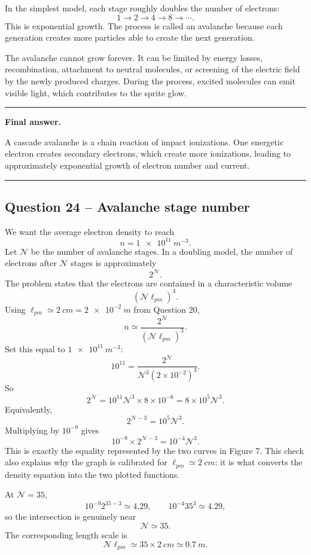 \documentclass[11pt,a4paper]{article}
\newenvironment{finalanswer}{%
  \begin{center}\begin{minipage}{0.94\linewidth}\hrule\vspace{0.45em}\textbf{Final answer. }%
}{%
  \vspace{0.45em}\hrule\end{minipage}\end{center}%
}
\begin{document}
In the simplest model, each stage roughly doubles the number of electrons:
\[
 1\to2\to4\to8\to\cdots.
\]
This is exponential growth. The process is called an avalanche because each generation creates more particles able to create the next generation.

The avalanche cannot grow forever. It can be limited by energy losses, recombination, attachment to neutral molecules, or screening of the electric field by the newly produced charges. During the process, excited molecules can emit visible light, which contributes to the sprite glow.

\begin{finalanswer}
A cascade avalanche is a chain reaction of impact ionizations. One energetic electron creates secondary electrons, which create more ionizations, leading to approximately exponential growth of electron number and current.
\end{finalanswer}

\subsection*{Question 24 -- Avalanche stage number}

We want the average electron density to reach
\[
 n=\SI{1e11}{m^{-3}}.
\]
Let $\mathcal{N}$ be the number of avalanche stages. In a doubling model, the number of electrons after $\mathcal{N}$ stages is approximately
\[
 2^{\mathcal{N}}.
\]
The problem states that the electrons are contained in a characteristic volume
\[
 (\mathcal{N}\ell_{pm})^3.
\]
Using $\ell_{pm}\simeq\SI{2}{cm}=\SI{2e-2}{m}$ from Question 20,
\[
 n\simeq\frac{2^{\mathcal{N}}}{(\mathcal{N}\ell_{pm})^3}.
\]
Set this equal to $\SI{1e11}{m^{-3}}$:
\[
 10^{11}=\frac{2^{\mathcal{N}}}{\mathcal{N}^3(2\times10^{-2})^3}.
\]
So
\[
 2^{\mathcal{N}}=10^{11}\mathcal{N}^3\times8\times10^{-6}
 =8\times10^5\mathcal{N}^3.
\]
Equivalently,
\[
 2^{\mathcal{N}-3}=10^5\mathcal{N}^3.
\]
Multiplying by $10^{-9}$ gives
\[
 10^{-9}\times 2^{\mathcal{N}-3}=10^{-4}\mathcal{N}^3.
\]
This is exactly the equality represented by the two curves in Figure 7. This check also explains why the graph is calibrated for \(\ell_{pm}\simeq\SI{2}{cm}\): it is what converts the density equation into the two plotted functions.

At \(\mathcal{N}=35\),
\[
10^{-9}2^{35-3}\simeq4.29,
\qquad
10^{-4}35^3\simeq4.29,
\]
so the intersection is genuinely near
\[
 \mathcal{N}\simeq35.
\]
The corresponding length scale is
\[
 \mathcal{N}\ell_{pm}\simeq35\times\SI{2}{cm}\simeq\SI{0.7}{m}.
\]
\end{document}
